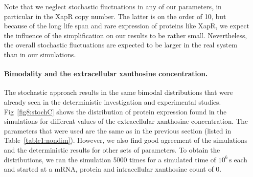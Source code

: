 \documentclass[10pt,letterpaper]{article}
\newcommand{\unit}[1]{\,\mathrm{#1}}
\begin{document}
	Note that we neglect stochastic fluctuations in any of our parameters, in particular in the XapR copy number. The latter is on the order of 10, but because of the long life span and rare expression of proteins like XapR, we expect the influence of the simplification on our results to be rather small. Nevertheless, the overall stochastic fluctuations are expected to be larger in the real system than in our simulations.
	
	\paragraph*{Bimodality and the extracellular xanthosine concentration.}
	The stochastic approach results in the same bimodal distributions that were already
	seen in the deterministic investigation and experimental studies.
	Fig~\ref{fig8:stochC} shows the distribution of protein expression found in
	the simulations for different values of the extracellular xanthosine
	concentration. The parameters that were used are the same as in the previous
	section (listed in Table~\ref{table1:nondim}). However, we also find good agreement of the simulations and the deterministic results for other sets of parameters. To obtain the distributions,
	we ran the simulation 5000 times for a simulated time of $10^6 \unit{s}$
	each and started at a mRNA, protein and intracellular xanthosine count of 0.
	
\end{document}

